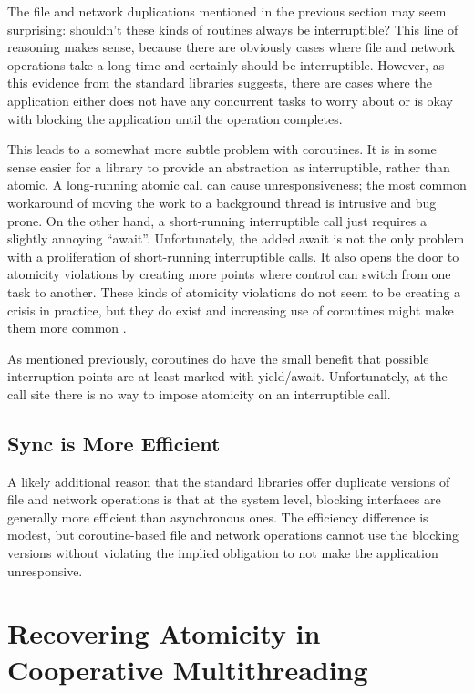 \documentclass[a4paper,UKenglish,cleveref, autoref]{lipics-v2019}
\begin{document}
The file and network duplications mentioned in the previous section may seem surprising: shouldn't these kinds of routines always be interruptible?
This line of reasoning makes sense, because there are obviously cases where file and network operations take a long time and certainly should be interruptible.
However, as this evidence from the standard libraries suggests, there are cases where the application either does not have any concurrent tasks to worry about or is okay with blocking the application until the operation completes.

This leads to a somewhat more subtle problem with coroutines.
It is in some sense easier for a library to provide an abstraction as interruptible, rather than atomic.
A long-running atomic call can cause unresponsiveness; the most common workaround of moving the work to a background thread is intrusive and bug prone.
On the other hand, a short-running interruptible call just requires a slightly annoying ``await''.
Unfortunately, the added await is not the only problem with a proliferation of short-running interruptible calls.
It also opens the door to atomicity violations by creating more points where control can switch from one task to another.
These kinds of atomicity violations do not seem to be creating a crisis in practice, but they do exist and increasing use of coroutines might make them more common \cite{Davis2017, Hong2014, Hsiao2014, Mutlu2015, Petrov2012, Wang2017, Zhang2017}.

As mentioned previously, coroutines do have the small benefit that possible interruption points are at least marked with yield{\slash}await.
Unfortunately, at the call site there is no way to impose atomicity on an interruptible call.

\subsection{Sync is More Efficient}

A likely additional reason that the standard libraries offer duplicate versions of file and network operations is that at the system level, blocking interfaces are generally more efficient than asynchronous ones.
The efficiency difference is modest, but coroutine-based file and network operations cannot use the blocking versions without violating the implied obligation to not make the application unresponsive.

\section{Recovering Atomicity in Cooperative Multithreading}
\end{document}
